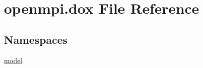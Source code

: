 \hypertarget{openmpi_8dox}{}\section{openmpi.\+dox File Reference}
\label{openmpi_8dox}
\subsection*{Namespaces}
\begin{DoxyCompactItemize}
\item 
 \hyperlink{namespacemodel}{model}
\end{DoxyCompactItemize}
